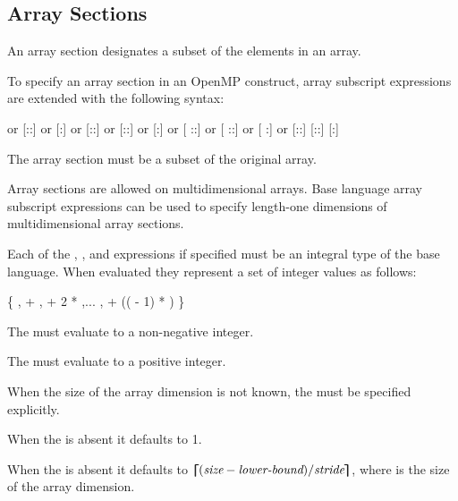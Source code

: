 \subsection{Array Sections}
\label{subsec:Array Sections}

An array section designates a subset of the elements in an array.

\begin{ccppspecific}

To specify an array section in an OpenMP construct, array subscript expressions are
extended with the following syntax:

\begin{indentedcodelist}
 \textnormal{or}
[::\plc{ }] \textnormal{or}
[:] \textnormal{or}
[:\plc{ }:] \textnormal{or}
[:\plc{ }:\plc{ }] \textnormal{or}
[:\plc{ }] \textnormal{or}
[ ::] \textnormal{or}
[ ::\plc{ }] \textnormal{or}
[ :] \textnormal{or}
[\plc{ }:\plc{ }:]
[\plc{ }:\plc{ }:\plc{ }]
[\plc{ }:\plc{ }]
\end{indentedcodelist}

The array section must be a subset of the original array.

Array sections are allowed on multidimensional arrays. Base language array subscript
expressions can be used to specify length-one dimensions of multidimensional array
sections.

Each of the , , and  expressions
if specified must be an integral type  of the base language.
When evaluated they represent a set of integer values as follows:

\{ ,  + ,  + 2 * ,... ,  + (( - 1) * ) \}

The  must evaluate to a non-negative integer.

The  must evaluate to a positive integer.

When the size of the array dimension is not known, the  must
be specified explicitly.

When the  is absent it defaults to 1.

When the  is absent it defaults to
$\blceil(\plc{size} - \plc{lower-bound})/\plc{stride}\brceil$, where  is
the size of the array dimension.


\end{ccppspecific}
